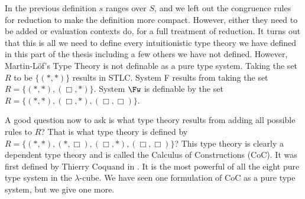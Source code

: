 In the previous definition $s$ ranges over $S$, and we left out the
congruence rules for reduction to make the definition more compact.
However, either they need to be added or evaluation contexts do, for a
full treatment of reduction.  It turns out that this is all we need to
define every intuitionistic type theory we have defined in this
part of the thesis including a few others we have not defined. However,
Martin-L\"of's Type Theory is not definable as a pure type system.
Taking the set $R$ to be $\{ (*,*) \}$ results in STLC.  System F
results from taking the set $R = \{ (*,*),(\Box,*) \}$. System $\Fw$
is definable by the set $R = \{(*,*),(\Box,*),(\Box,\Box)\}$.

A good question now to ask is what type theory results from adding all
possible rules to $R$?  That is what type theory is defined by $R = \{(*,*), (*, \Box), (\Box,*), (\Box,\Box)\}$?  This type theory is
clearly a dependent type theory and is called the Calculus of
Constructions (CoC).  It was first defined by Thierry Coquand in
\cite{Coquand:1988}.  It is the most powerful of all the eight pure type
system in the $\lambda$-cube.  We have seen one formulation of CoC as
a pure type system, but we give one more.  

